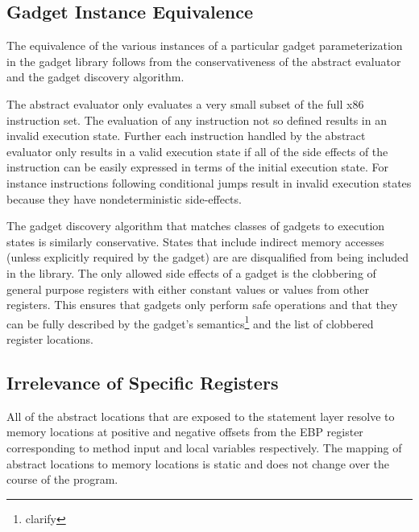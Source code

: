 \documentclass[finalcopy,short]{srpaper}
\begin{document}
        \subsection{Gadget Instance Equivalence}
            
            The equivalence of the various instances of a particular gadget
            parameterization in the gadget library follows from the
            conservativeness of the abstract evaluator and the gadget discovery
            algorithm.

            The abstract evaluator only evaluates a very small subset of the
            full x86 instruction set. The evaluation of any instruction not so
            defined results in an invalid execution state. Further each
            instruction handled by the abstract evaluator only results in a
            valid execution state if all of the side effects of the instruction
            can be easily expressed in terms of the initial execution state.
            For instance instructions following conditional jumps result in
            invalid execution states because they have nondeterministic
            side-effects.

            The gadget discovery algorithm that matches classes of gadgets to
            execution states is similarly conservative. States that include
            indirect memory accesses (unless explicitly required by the gadget)
            are are disqualified from being included in the library. The only
            allowed side effects of a gadget is the clobbering of general
            purpose registers with either constant values or values from other
            registers. This ensures that gadgets only perform safe operations
            and that they can be fully described by the gadget's
            semantics\footnote{clarify} and the list of clobbered register
            locations.

        \subsection{Irrelevance of Specific Registers}

            All of the abstract locations that are exposed to the statement
            layer resolve to memory locations at positive and negative offsets
            from the EBP register corresponding to method input and local
            variables respectively. The mapping of abstract locations to memory
            locations is static and does not change over the course of the
            program.
\end{document}
